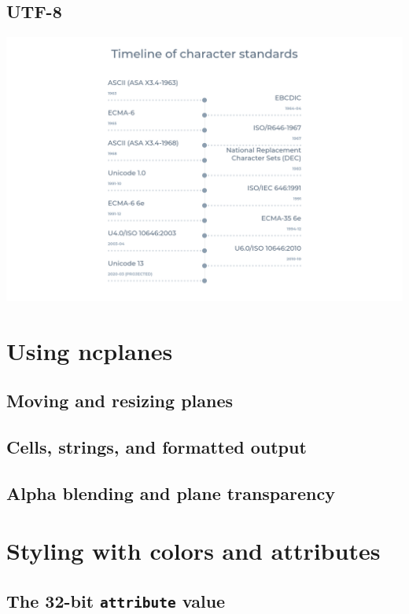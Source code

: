 \documentclass[letterpaper,10pt]{article}
\begin{document}
\subsection{UTF-8}

\begin{center}
\includegraphics[width=.9\linewidth]{media/charset-timeline.png}
\end{center}


\newpage
\section{Using ncplanes}
\label{ncplane}
\subsection{Moving and resizing planes}
\subsection{Cells, strings, and formatted output}
\subsection{Alpha blending and plane transparency}

\section{Styling with colors and attributes}
\subsection{The 32-bit \texttt{attribute} value}
\end{document}
